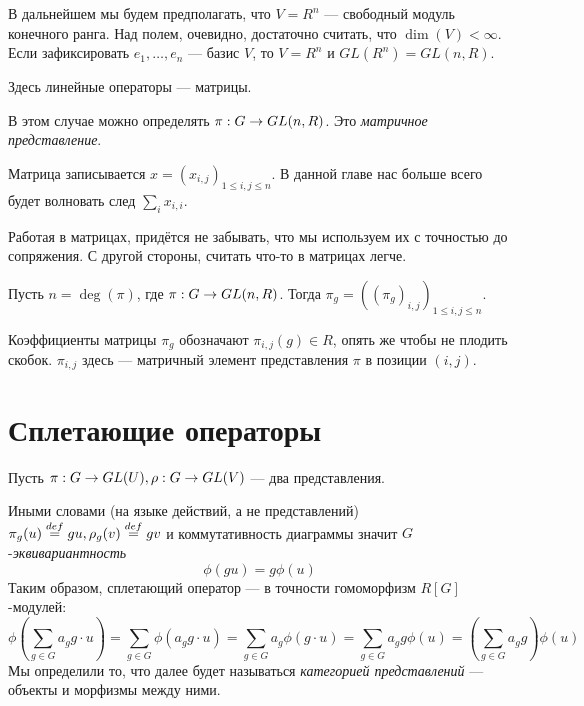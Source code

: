 В дальнейшем мы будем предполагать, что $V = R^n$ --- свободный модуль конечного ранга.
Над полем, очевидно, достаточно считать, что $\dim(V) < \infty$.
Если зафиксировать $e_1, \dots, e_n$ --- базис $V$, то $V = R^n$ и $GL(R^n) = GL(n, R)$.

Здесь линейные операторы --- матрицы.

В этом случае можно определять $\pi: G \rightarrow GL(n, R)$.
Это \emph{матричное представление}.

\ok
Матрица записывается $x = (x_{i,j})_{1 \le i,j \le n}$.
В данной главе нас больше всего будет волновать след $\sum\limits_{i}x_{i,i}$.

Работая в матрицах, придётся не забывать, что мы используем их с точностью до сопряжения.
С другой стороны, считать что-то в матрицах легче.

Пусть $n = \deg(\pi)$, где $\pi: G \rightarrow GL(n, R)$.
Тогда $\pi_g = ((\pi_g)_{i,j})_{1 \le i,j \le n}$.

Коэффициенты матрицы $\pi_g$ обозначают $\pi_{i,j}(g) \in R$, опять же чтобы не плодить скобок.
$\pi_{i,j}$ здесь --- матричный элемент представления $\pi$ в позиции $(i,j)$.


\section{Сплетающие операторы}
Пусть $\pi:G \rightarrow GL(U), \rho: G \rightarrow GL(V)$ --- два представления.

Иными словами (на языке действий, а не представлений) $\pi_g(u) \overset{def}{=} gu, \rho_g(v) \overset{def}{=} gv$ и коммутативность диаграммы значит $G$-\emph{эквивариантность}
\[\phi(gu) = g\phi(u)\]
Таким образом, сплетающий оператор --- в точности гомоморфизм $R[G]$-модулей:
\[\phi\left(\sum\limits_{g \in G}a_g g\cdot  u\right) = \sum\limits_{g \in G}\phi(a_g g \cdot u) = \sum\limits_{g \in G}a_g\phi(g \cdot u) = \sum\limits_{g \in G}a_g g \phi(u) = \left(\sum\limits_{g \in G}a_g g\right) \phi(u)\]
Мы определили то, что далее будет называться \emph{категорией представлений} --- объекты и морфизмы между ними.


